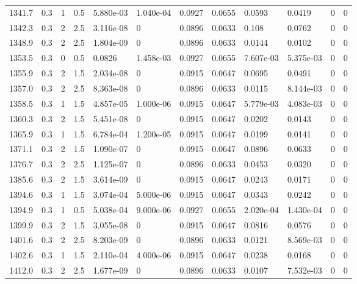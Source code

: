 \documentclass[preview]{standalone}
\begin{document}
{{{{{{{{\begin{tabular}{L{1.2cm}C{1.2cm} C{0.3cm}C{0.5cm} C{1.4cm}C{1.4cm} C{1.4cm}C{1.4cm} C{1.6cm}C{1.6cm} C{1.6cm}C{1.6cm}}
  1341.7  &   0.3  & 1     & 0.5 &  5.880e-03  & 1.040e-04  &  0.0927&   0.0655& 0.0593 & 0.0419   &  0 & 0  \\ 
  1342.3  &   0.3  & 2     & 2.5 &  3.116e-08  & 0  &  0.0896&   0.0633& 0.108 & 0.0762   &  0 & 0  \\ 
  1348.9  &   0.3  & 2     & 2.5 &  1.804e-09  & 0  &  0.0896&   0.0633& 0.0144 & 0.0102   &  0 & 0  \\ 
  1353.5  &   0.3  & 0     & 0.5 &  0.0826  & 1.458e-03  &  0.0927&   0.0655& 7.607e-03 & 5.375e-03   &  0 & 0  \\ 
  1355.9  &   0.3  & 2     & 1.5 &  2.034e-08  & 0  &  0.0915&   0.0647& 0.0695 & 0.0491   &  0 & 0  \\ 
  1357.0  &   0.3  & 2     & 2.5 &  8.363e-08  & 0  &  0.0896&   0.0633& 0.0115 & 8.144e-03   &  0 & 0  \\ 
  1358.5  &   0.3  & 1     & 1.5 &  4.857e-05  & 1.000e-06  &  0.0915&   0.0647& 5.779e-03 & 4.083e-03   &  0 & 0  \\ 
  1360.3  &   0.3  & 2     & 1.5 &  5.451e-08  & 0  &  0.0915&   0.0647& 0.0202 & 0.0143   &  0 & 0  \\ 
  1365.9  &   0.3  & 1     & 1.5 &  6.784e-04  & 1.200e-05  &  0.0915&   0.0647& 0.0199 & 0.0141   &  0 & 0  \\ 
  1371.1  &   0.3  & 2     & 1.5 &  1.090e-07  & 0  &  0.0915&   0.0647& 0.0896 & 0.0633   &  0 & 0  \\ 
  1376.7  &   0.3  & 2     & 2.5 &  1.125e-07  & 0  &  0.0896&   0.0633& 0.0453 & 0.0320   &  0 & 0  \\ 
  1385.6  &   0.3  & 2     & 1.5 &  3.614e-09  & 0  &  0.0915&   0.0647& 0.0243 & 0.0171   &  0 & 0  \\ 
  1394.6  &   0.3  & 1     & 1.5 &  3.074e-04  & 5.000e-06  &  0.0915&   0.0647& 0.0343 & 0.0242   &  0 & 0  \\ 
  1394.9  &   0.3  & 1     & 0.5 &  5.038e-04  & 9.000e-06  &  0.0927&   0.0655& 2.020e-04 & 1.430e-04   &  0 & 0  \\ 
  1399.9  &   0.3  & 2     & 1.5 &  3.055e-08  & 0  &  0.0915&   0.0647& 0.0816 & 0.0576   &  0 & 0  \\ 
  1401.6  &   0.3  & 2     & 2.5 &  8.203e-09  & 0  &  0.0896&   0.0633& 0.0121 & 8.569e-03   &  0 & 0  \\ 
  1402.6  &   0.3  & 1     & 1.5 &  2.110e-04  & 4.000e-06  &  0.0915&   0.0647& 0.0238 & 0.0168   &  0 & 0  \\ 
  1412.0  &   0.3  & 2     & 2.5 &  1.677e-09  & 0  &  0.0896&   0.0633& 0.0107 & 7.532e-03   &  0 & 0  \\ 

\end{tabular}}}}}}}}}
\end{document}
